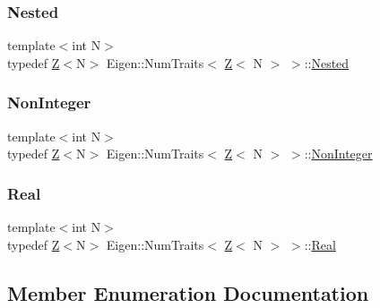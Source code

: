 \subsubsection{\texorpdfstring{Nested}{Nested}}
{\footnotesize\ttfamily template$<$int N$>$ \\
typedef \hyperlink{classZ}{Z}$<$N$>$ Eigen\+::\+Num\+Traits$<$ \hyperlink{classZ}{Z}$<$ N $>$ $>$\+::\hyperlink{structEigen_1_1NumTraits_3_01Z_3_01N_01_4_01_4_aadda945d9b822d2c43cddd141d895ab5}{Nested}}

\mbox{\label{structEigen_1_1NumTraits_3_01Z_3_01N_01_4_01_4_a54a7b88f9d282c613909ac128476d3d1}} 
\subsubsection{\texorpdfstring{Non\+Integer}{NonInteger}}
{\footnotesize\ttfamily template$<$int N$>$ \\
typedef \hyperlink{classZ}{Z}$<$N$>$ Eigen\+::\+Num\+Traits$<$ \hyperlink{classZ}{Z}$<$ N $>$ $>$\+::\hyperlink{structEigen_1_1NumTraits_3_01Z_3_01N_01_4_01_4_a54a7b88f9d282c613909ac128476d3d1}{Non\+Integer}}

\mbox{\label{structEigen_1_1NumTraits_3_01Z_3_01N_01_4_01_4_a44847690171e3535ea893e5d3742d5dc}} 
\subsubsection{\texorpdfstring{Real}{Real}}
{\footnotesize\ttfamily template$<$int N$>$ \\
typedef \hyperlink{classZ}{Z}$<$N$>$ Eigen\+::\+Num\+Traits$<$ \hyperlink{classZ}{Z}$<$ N $>$ $>$\+::\hyperlink{structEigen_1_1NumTraits_3_01Z_3_01N_01_4_01_4_a44847690171e3535ea893e5d3742d5dc}{Real}}



\subsection{Member Enumeration Documentation}
\mbox{\label{structEigen_1_1NumTraits_3_01Z_3_01N_01_4_01_4_a1d8939bd585b60ec61e806fc7746335e}} 
